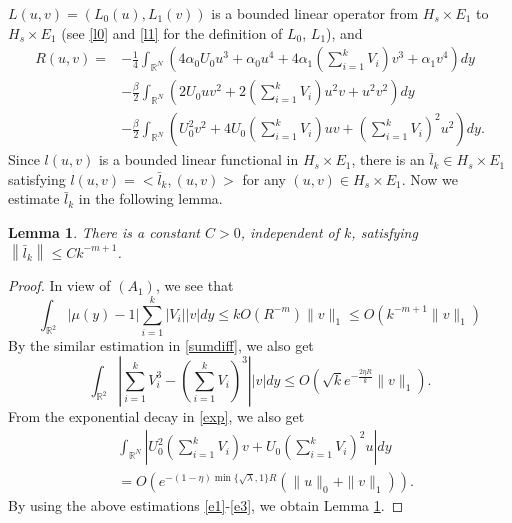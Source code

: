 \documentclass{amsart}
\newtheorem{lemma}[theorem]{Lemma}
\theoremstyle{definition}
\theoremstyle{remark}
\numberwithin{equation}{section}
\begin{document}
$L(u, v)=\left(L_{0}(u), L_{1}(v)\right)$  is a bounded linear operator from $H_s \times E_{1}$ to $H_s \times E_{1}$ (see \eqref{l0} and \eqref{l1} for the definition of $L_0$, $L_1$), and
\begin{equation}
\begin{aligned}
R(u, v)=&-\frac{1}{4}\int_{\mathbb{R}^{N}}\left(4\alpha_0 U_{0} u^{3}+\alpha_0 u^{4}+4\alpha_1\left(\sum_{i=1}^{k} V_{i}\right) v^{3}+ \alpha_1 v^{4}\right) d y \\
&-\frac{\beta}{2} \int_{\mathbb{R}^{N}}\left(2U_{0} u v^{2}+2\left(\sum_{i=1}^{k} V_{i}\right) u^{2} v+u^2v^2\right) d y
\\
&-\frac{\beta}{2} \int_{\mathbb{R}^{N}}\left(U_{0}^{2} v^2+4U_{0}\left(\sum_{i=1}^{k} V_{i}\right) uv+\left(\sum_{i=1}^{k} V_{i}\right)^2u^2\right) d y.
\end{aligned}
\end{equation}
 Since $l(u, v)$ is a bounded linear functional in $H_s \times E_{1}$, there is an $\bar{l}_{k} \in H_s \times E_{1}$ satisfying $l(u, v)=<\bar{l}_{k},(u, v)>$ for any $(u, v) \in H_s \times E_{1}$. Now we estimate $\bar{l}_{k}$ in the following lemma.
\begin{lemma}\label{lem_lin}   There is a constant $C>0$, independent of $k$, satisfying $\left\|\bar{l}_{k}\right\| \leq C k^{-m+1}$.\end{lemma}
\begin{proof}In view of $\left(A_{1}\right)$, we see that
\begin{equation}\label{e1}
\int_{\mathbb{R}^{2}}|\mu(y)-1| \sum_{i=1}^{k}\left|V_{i}\right||v| d y \leq k O\left(R^{-m}\right)\|v\|_{1} \leq O\left(k^{-m+1}\|v\|_{1}\right)
\end{equation}
By the similar estimation in \eqref{sumdiff}, we also get
\begin{equation}\label{e2}
\int_{\mathbb{R}^{2}}\left|\sum_{i=1}^{k} V_{i}^{3}-\left(\sum_{i=1}^{k} V_{i}\right)^{3}\right||v| d y \leq O\left(\sqrt{k} e^{-\frac{2 \eta R}{k}}\|v\|_{1}\right).
\end{equation}
From the exponential decay in \eqref{exp}, we also get
\begin{equation}\begin{aligned}\label{e3}
&  \int_{\mathbb{R}^{N}}\left|U_{0}^{2}\left(\sum_{i=1}^{k} V_{i}\right) v+U_{0}\left(\sum_{i=1}^{k} V_{i}\right)^{2} u\right|d y\\&=O\left(e^{-(1-\eta)\min\{\sqrt{\lambda},1\} R}(\|u\|_0+\|v\|_{1})\right).\end{aligned}
\end{equation}
By using the above estimations \eqref{e1}-\eqref{e3}, we obtain Lemma \ref{lem_lin}.
\end{proof}
\end{document}
